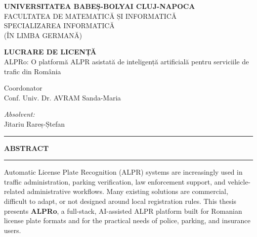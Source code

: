 ﻿\documentclass[12pt,a4paper]{article}
\begin{document}
\begin{titlepage}
\centering

\vspace*{1cm}

{\Large \textbf{UNIVERSITATEA BABEȘ-BOLYAI CLUJ-NAPOCA}}\\[0.2cm]
{\large FACULTATEA DE MATEMATICĂ ȘI INFORMATICĂ}\\[0.2cm]
{\large SPECIALIZAREA INFORMATICĂ}\\
{\large (ÎN LIMBA GERMANĂ)}\\

\vspace{4cm}

{\LARGE \textbf{LUCRARE DE LICENȚĂ}}\\[1.5cm]
{\Large ALPRo: O platformă ALPR asistată de inteligență artificială pentru serviciile de trafic din România}

\vfill

\begin{flushleft}
Coordonator\\
Conf. Univ. Dr. AVRAM Sanda-Maria
\end{flushleft}

\begin{flushright}
\textit{Absolvent:}\\
Jitariu Rareș-Ștefan
\end{flushright}

\vspace{1cm}

\end{titlepage}



\newpage
\thispagestyle{empty}
\mbox{}

\newpage
\begin{center}
\rule{\textwidth}{0.4pt}
\vspace{0.3cm}

\textbf{\large ABSTRACT}

\vspace{0.3cm}
\rule{\textwidth}{0.4pt}
\end{center}

\vspace{0.8cm}
\onehalfspacing

Automatic License Plate Recognition (ALPR) systems are increasingly used in traffic administration, parking verification, law enforcement support, and vehicle-related administrative workflows. Many existing solutions are commercial, difficult to adapt, or not designed around local registration rules. This thesis presents \textbf{ALPRo}, a full-stack, AI-assisted ALPR platform built for Romanian license plate formats and for the practical needs of police, parking, and insurance users.
\end{document}

